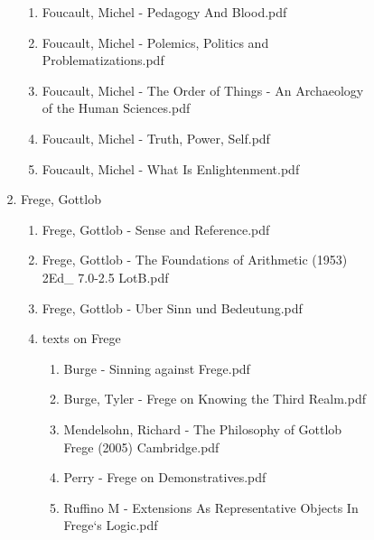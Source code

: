 \documentclass[11pt]{article}
\begin{document}
\begin{enumerate}
\begin{enumerate}
\begin{enumerate}
\begin{enumerate}
\begin{enumerate}
\begin{enumerate}
\item Foucault, Michel - Pedagogy And Blood.pdf
\label{sec-1-1-1-1-7-3-14-33-6}

\item Foucault, Michel - Polemics, Politics and Problematizations.pdf
\label{sec-1-1-1-1-7-3-14-33-7}

\item Foucault, Michel - The Order of Things - An Archaeology of the Human Sciences.pdf
\label{sec-1-1-1-1-7-3-14-33-8}

\item Foucault, Michel - Truth, Power, Self.pdf
\label{sec-1-1-1-1-7-3-14-33-9}

\item Foucault, Michel - What Is Enlightenment.pdf
\label{sec-1-1-1-1-7-3-14-33-10}
\end{enumerate}

\item Frege, Gottlob
\label{sec-1-1-1-1-7-3-14-34}
\begin{enumerate}
\item Frege, Gottlob - Sense and Reference.pdf
\label{sec-1-1-1-1-7-3-14-34-1}

\item Frege, Gottlob - The Foundations of Arithmetic (1953) 2Ed\_ 7.0-2.5 LotB.pdf
\label{sec-1-1-1-1-7-3-14-34-2}

\item Frege, Gottlob - Uber Sinn und Bedeutung.pdf
\label{sec-1-1-1-1-7-3-14-34-3}

\item texts on Frege
\label{sec-1-1-1-1-7-3-14-34-4}
\begin{enumerate}
\item Burge - Sinning against Frege.pdf
\label{sec-1-1-1-1-7-3-14-34-4-1}

\item Burge, Tyler - Frege on Knowing the Third Realm.pdf
\label{sec-1-1-1-1-7-3-14-34-4-2}

\item Mendelsohn, Richard - The Philosophy of Gottlob Frege (2005) Cambridge.pdf
\label{sec-1-1-1-1-7-3-14-34-4-3}

\item Perry - Frege on Demonstratives.pdf
\label{sec-1-1-1-1-7-3-14-34-4-4}

\item Ruffino M - Extensions As Representative Objects In Frege‘s Logic.pdf
\label{sec-1-1-1-1-7-3-14-34-4-5}
\end{enumerate}
\end{enumerate}


\end{enumerate}
\end{enumerate}
\end{enumerate}
\end{enumerate}
\end{enumerate}
\end{document}
